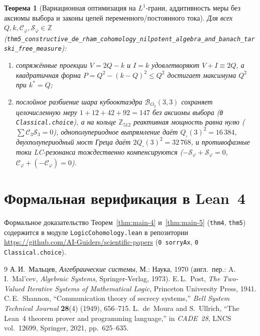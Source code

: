 \documentclass[11pt,a4paper]{article}
\theoremstyle{plain}
\newtheorem{theorem}{Теорема}[section]
\theoremstyle{definition}
\begin{document}
\begin{theorem}[Вариационная оптимизация на $L^1$-грани, аддитивность меры без аксиомы выбора и законы цепей переменного/постоянного тока]
\label{thm:main-5c}
Для всех $Q,k,\mathcal{C}_\varphi,\mathcal{S}_\varphi\in\mathbb{Z}$ (\texttt{thm5\_constructive\_de\_rham\_cohomology\_nilpotent\_algebra\_and\_banach\_tarski\_free\_measure}):
\begin{enumerate}[label=\textbf{(\roman*)},leftmargin=*,noitemsep]
\item сопряжённые проекции $V = 2Q-k$ и $I = k$ удовлетворяют $V+I \equiv 2Q$, а квадратичная форма $P = Q^2 - (k-Q)^2 \le Q^2$ достигает максимума $Q^2$ при $k^* = Q$;
\item послойное разбиение шара кубооктаэдра $\mathcal{B}_{O_2}(3,3)$ сохраняет целочисленную меру $1 + 12 + 42 + 92 = 147$ без аксиомы выбора (\texttt{0 Classical.choice}), а на кольце $\mathbb{Z}_{512}$ реактивная мощность равна нулю ($\sum\mathcal{C}_3\mathcal{S}_3 = 0$), однополупериодное выпрямление даёт $Q_\square(3)^2 = 16\,384$, двухполупериодный мост Греца даёт $2Q_\square(3)^2 = 32\,768$, и противофазные токи LC-резонанса тождественно компенсируются ($-\mathcal{S}_\varphi + \mathcal{S}_\varphi = 0$, $\mathcal{C}_\varphi + (-\mathcal{C}_\varphi) = 0$).
\end{enumerate}
\end{theorem}

\section{Формальная верификация в Lean~4}
Формальное доказательство Теорем~\ref{thm:main-4} и~\ref{thm:main-5} (\texttt{thm4}, \texttt{thm5}) содержится в модуле \texttt{LogicCohomology.lean} в репозитории \url{https://github.com/AI-Guiders/scientific-papers} (\texttt{0 sorryAx}, \texttt{0 Classical.choice}).

\begin{thebibliography}{9}
А.\,И.~Мальцев, \emph{Алгебраические системы}, М.: Наука, 1970 (англ.\ пер.: A.\,I.~Mal'cev, \emph{Algebraic Systems}, Springer-Verlag, 1973).
E.\,L.~Post, \emph{The Two-Valued Iterative Systems of Mathematical Logic}, Princeton University Press, 1941.
C.\,E.~Shannon, ``Communication theory of secrecy systems,'' \emph{Bell System Technical Journal} \textbf{28}(4) (1949), 656--715.
L.~de~Moura and S.~Ullrich, ``The Lean~4 theorem prover and programming language,'' in \emph{CADE~28}, LNCS vol.~12699, Springer, 2021, pp.~625--635.
\end{thebibliography}
\end{document}
